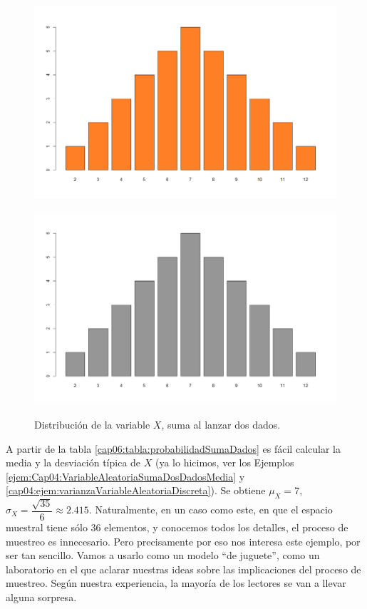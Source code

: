\begin{ejemplo}
\begin{figure}[h!]
\begin{center}
\begin{enColor}
\includegraphics[width=12cm]{../fig/cap06-DistribucionOriginalVsMuestral-01.png}\\
\end{enColor}
\begin{bn}
\includegraphics[width=12cm]{../fig/cap06-DistribucionOriginalVsMuestral-01-bn.png}\\
\end{bn}
\caption{Distribución de la variable $X$, suma al lanzar dos dados.}
\label{cap06:fig:distribucionXDosDados}
\end{center}
\end{figure}

    A partir de la tabla \ref{cap06:tabla:probabilidadSumaDados} es fácil calcular la media y la
    desviación típica de $X$ (ya lo hicimos, ver los Ejemplos
    \ref{ejem:Cap04:VariableAleatoriaSumaDosDadosMedia} y
    \ref{cap04:ejem:varianzaVariableAleatoriaDiscreta}). Se obtiene $\mu_X=7$,
    $\sigma_X=\dfrac{\sqrt{35}}{6}\approx 2.415$. Naturalmente, en un caso como este, en que el
    espacio muestral tiene sólo 36 elementos, y conocemos todos los detalles, el proceso de
    muestreo es innecesario. Pero precisamente por eso nos interesa este ejemplo, por ser tan
    sencillo. Vamos a usarlo como un modelo  ``de juguete'', como un laboratorio en el que aclarar
    nuestras ideas sobre las implicaciones del proceso de muestreo. Según nuestra experiencia, la
    mayoría de los lectores se van a llevar alguna sorpresa.


\end{ejemplo}
